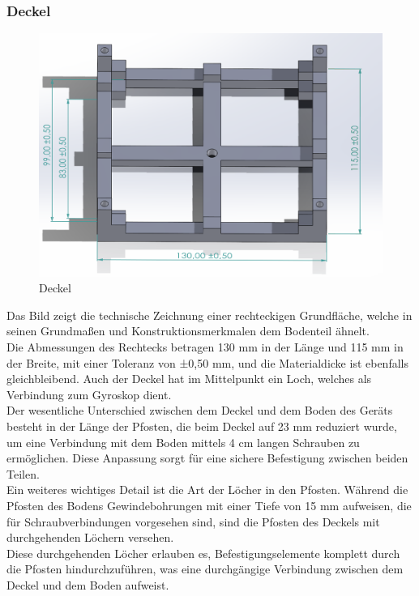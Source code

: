 \subsubsection{Deckel}
\begin{figure}[H]
    \centering
    \includegraphics[scale=0.7]{image/deckel.png}
    \caption{Deckel}
    \label{fig:enter-label}
\end{figure}
\vspace{3mm}
Das Bild zeigt die technische Zeichnung einer rechteckigen Grundfläche, welche in seinen Grundmaßen und Konstruktionsmerkmalen dem Bodenteil ähnelt.\\
\vspace{3mm}
Die Abmessungen des Rechtecks betragen 130 mm in der Länge und 115 mm in der Breite, mit einer Toleranz von ±0,50 mm, und die Materialdicke ist ebenfalls gleichbleibend. Auch der Deckel hat im Mittelpunkt ein Loch, welches als Verbindung zum Gyroskop dient.\\
\vspace{3mm}
Der wesentliche Unterschied zwischen dem Deckel und dem Boden des Geräts besteht in der Länge der Pfosten, die beim Deckel auf 23 mm reduziert wurde, um eine Verbindung mit dem Boden mittels 4 cm langen Schrauben zu ermöglichen. Diese Anpassung sorgt für eine sichere Befestigung zwischen beiden Teilen.\\
\vspace{3mm}
Ein weiteres wichtiges Detail ist die Art der Löcher in den Pfosten. Während die Pfosten des Bodens Gewindebohrungen mit einer Tiefe von 15 mm aufweisen, die für Schraubverbindungen vorgesehen sind, sind die Pfosten des Deckels mit durchgehenden Löchern versehen. \\ 
\vspace{3mm}
Diese durchgehenden Löcher erlauben es, Befestigungselemente komplett durch die Pfosten hindurchzuführen, was eine durchgängige Verbindung zwischen dem Deckel und dem Boden aufweist.
\newpage
